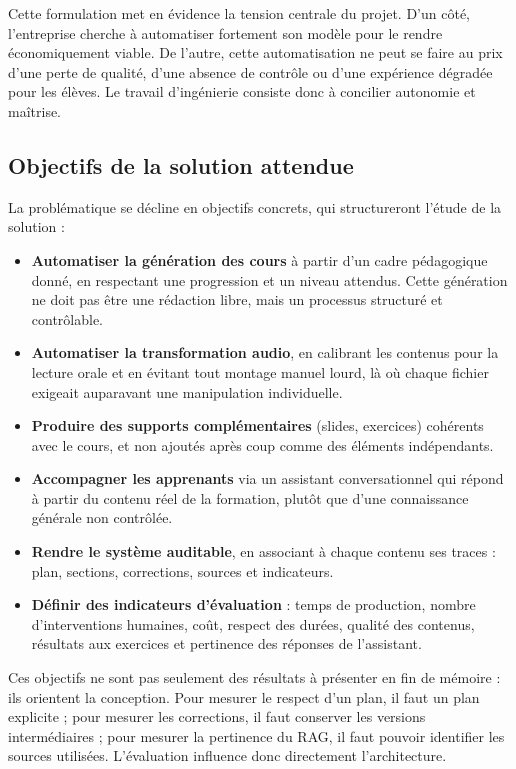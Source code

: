 Cette formulation met en évidence la tension centrale du projet. D'un côté, l'entreprise
cherche à automatiser fortement son modèle pour le rendre économiquement viable. De
l'autre, cette automatisation ne peut se faire au prix d'une perte de qualité, d'une absence
de contrôle ou d'une expérience dégradée pour les élèves. Le travail d'ingénierie consiste
donc à concilier autonomie et maîtrise.

\subsection{Objectifs de la solution attendue}

La problématique se décline en objectifs concrets, qui structureront l'étude de la solution :

\begin{itemize}
\item \textbf{Automatiser la génération des cours} à partir d'un cadre pédagogique donné,
en respectant une progression et un niveau attendus. Cette génération ne doit pas être une
rédaction libre, mais un processus structuré et contrôlable.
\item \textbf{Automatiser la transformation audio}, en calibrant les contenus pour la
lecture orale et en évitant tout montage manuel lourd, là où chaque fichier exigeait
auparavant une manipulation individuelle.
\item \textbf{Produire des supports complémentaires} (slides, exercices) cohérents avec le
cours, et non ajoutés après coup comme des éléments indépendants.
\item \textbf{Accompagner les apprenants} via un assistant conversationnel qui répond à
partir du contenu réel de la formation, plutôt que d'une connaissance générale non
contrôlée.
\item \textbf{Rendre le système auditable}, en associant à chaque contenu ses traces :
plan, sections, corrections, sources et indicateurs.
\item \textbf{Définir des indicateurs d'évaluation} : temps de production, nombre
d'interventions humaines, coût, respect des durées, qualité des contenus, résultats aux
exercices et pertinence des réponses de l'assistant.
\end{itemize}

Ces objectifs ne sont pas seulement des résultats à présenter en fin de mémoire : ils
orientent la conception. Pour mesurer le respect d'un plan, il faut un plan explicite ; pour
mesurer les corrections, il faut conserver les versions intermédiaires ; pour mesurer la
pertinence du RAG, il faut pouvoir identifier les sources utilisées. L'évaluation
influence donc directement l'architecture.

